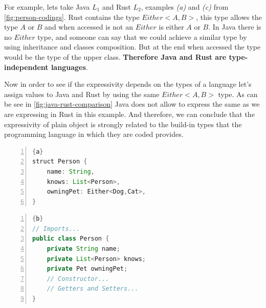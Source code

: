 For example, lets take Java \textit{$L_1$} and Rust \textit{$L_2$}, examples \textit{(a)} and \textit{(c)} from \cref{fig:person-codings}.
Rust contains the type $Either<A,B>$, this type allows the type $A$ or $B$ and when accessed is not an $Either$ is either $A$ or $B$. In
Java there is no $Either$ type, and someone can say that we could achieve a similar type by using inheritance and classes composition. But
at the end when accessed the type would be the type of the upper class. \textbf{Therefore Java and Rust are type-independent languages}.

Now in order to see if the expressivity depends on the types of a language let's assign values to Java and Rust by using the same
$Either<A,B>$ type. As can be see in \cref{fig:java-rust-comparison} Java does not allow to express the same as we are expressing in Rust
in this example. And therefore, we can conclude that the expressivity of plain object is strongly related to the build-in types that
the programming language in which they are coded provides.

\begin{center}
	\noindent\begin{minipage}[t]{.4\textwidth}
        \begin{lstlisting}[language=Java,frame=topline,numbers=left,title=\scriptsize{Person Rust Struct},
            basicstyle=\ttfamily\scriptsize]{a}
struct Person {
    name: String,
    knows: List<Person>,
    owningPet: Either<Dog,Cat>,
}
		\end{lstlisting}
	\end{minipage}\hfill
	\begin{minipage}[t]{.5\textwidth}
        \begin{lstlisting}[language=Java, frame=t,numbers=left,title=\scriptsize{Person Java Object},
            basicstyle=\ttfamily\scriptsize]{b}
// Imports...
public class Person {
    private String name;
    private List<Person> knows;
    private Pet owningPet;
    // Constructor...
    // Getters and Setters...
}
		\end{lstlisting}
	\end{minipage}
	\label{fig:java-rust-comparison}
\end{center}


